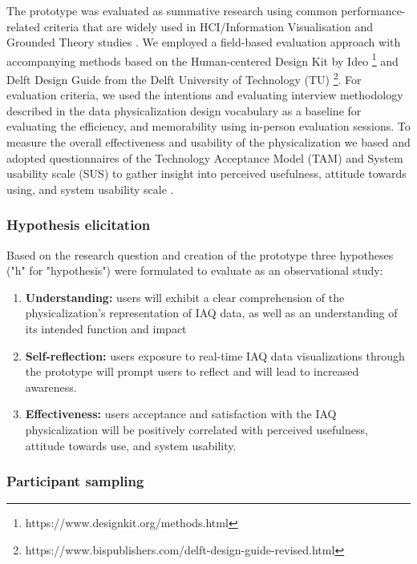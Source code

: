 The prototype was evaluated as summative research using common performance-related criteria that are widely used in HCI/Information Visualisation \cite{ranasinghe_encoding_2023} and Grounded Theory studies \cite{chun_tie_grounded_2019}. We employed a field-based evaluation approach with accompanying methods based on the Human-centered Design Kit by Ideo \footnote{https://www.designkit.org/methods.html} and Delft Design Guide from the Delft University of Technology (TU) \footnote{https://www.bispublishers.com/delft-design-guide-revised.html}. For evaluation criteria, we used the intentions and evaluating interview methodology described in the data physicalization design vocabulary \cite{jansen_evaluating_2013,ranasinghe_encoding_2023} as a baseline for evaluating the efficiency, and memorability using in-person evaluation sessions. To measure the overall effectiveness and usability of the physicalization we based and adopted questionnaires of the Technology Acceptance Model (TAM) and System usability scale (SUS) to gather insight into perceived usefulness, attitude towards using, and system usability scale \cite{davis_perceived_1989, brooke_sus_1996}. 

\subsubsection{Hypothesis elicitation}

Based on the research question and creation of the prototype three hypotheses ("h" for "hypothesis") were formulated to evaluate as an observational study:

\begin{enumerate}
    \renewcommand{\labelenumi}{H\arabic{enumi}:}
    \item \textbf{Understanding:} users will exhibit a clear comprehension of the physicalization's representation of IAQ data, as well as an understanding of its intended function and impact
    \item \textbf{Self-reflection:} users exposure to real-time IAQ data visualizations through the prototype will prompt users to reflect and will lead to increased awareness.
    \item \textbf{Effectiveness:} users acceptance and satisfaction with the IAQ physicalization will be positively correlated with perceived usefulness, attitude towards use, and system usability.
\end{enumerate}

\subsubsection{Participant sampling}

